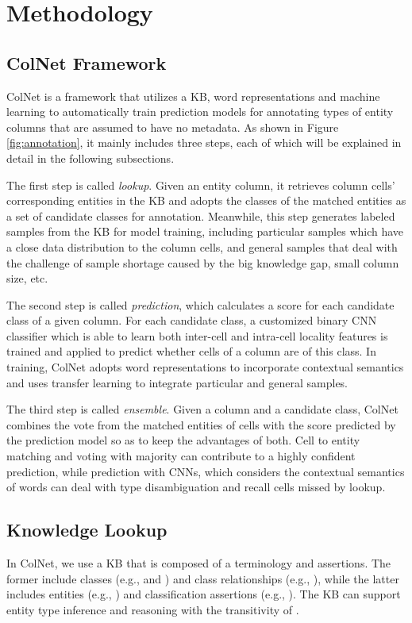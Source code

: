 \documentclass[letterpaper]{article}
\newcommand{\ernesto}[1]{{\color{black}#1}}
\newcommand{\rv}[1]{{\color{black}#1}}
\newcommand{\camera}[1]{{\color{black}#1}}
\newcommand{\ColNet}{\textsf{ColNet}\xspace}
\begin{document}
\section{Methodology}

\subsection{\ColNet Framework}

\ColNet is
a framework that utilizes a KB, word representations and machine learning to automatically train prediction models for annotating types of entity columns that are assumed to have no metadata.
As shown in Figure \ref{fig:annotation}, it mainly includes three steps, 
\rv{each of which will be explained in detail in the following subsections.}

The first step is called \textit{lookup}.
Given an entity column,
it retrieves column cells' corresponding entities in the KB and adopts the classes of the matched entities as a set of candidate classes for annotation.
Meanwhile, this step generates labeled samples from the KB for model training,
including particular samples which have a close data distribution to the column cells,
and general samples that 
deal with the challenge of \rv{sample shortage}
caused by the big knowledge gap, small column size, etc.


The second step is called \textit{prediction}, 
which calculates a score for each candidate class \rv{of} a given column.
For each candidate class, a customized binary CNN classifier
which is able to learn both inter-cell and intra-cell locality features
is trained and applied to predict whether cells of a column are of this class.
In training, \ColNet adopts \rv{word representations to incorporate contextual semantics and uses transfer learning to integrate particular and general samples.}



The third step is called \textit{ensemble}.
Given a column and a candidate class,
\ColNet combines the vote from the matched entities of cells with the score predicted by the prediction model 
so as to keep the advantages of both.
Cell to entity matching and voting with majority can contribute to a highly confident prediction,
while prediction with CNNs, which \camera{considers} the contextual \rv{semantics} of words
can deal with \rv{type disambiguation and recall cells missed by lookup}.


\subsection{Knowledge Lookup}
\rv{In \ColNet, we use a KB that is composed of 
\ernesto{a terminology}
and assertions.
The former include classes (e.g.,  and ) and class relationships (e.g., ),
while the latter includes entities (e.g., ) and classification assertions (e.g., ).
The KB can support entity type inference and reasoning with the transitivity of .
}
\end{document}
